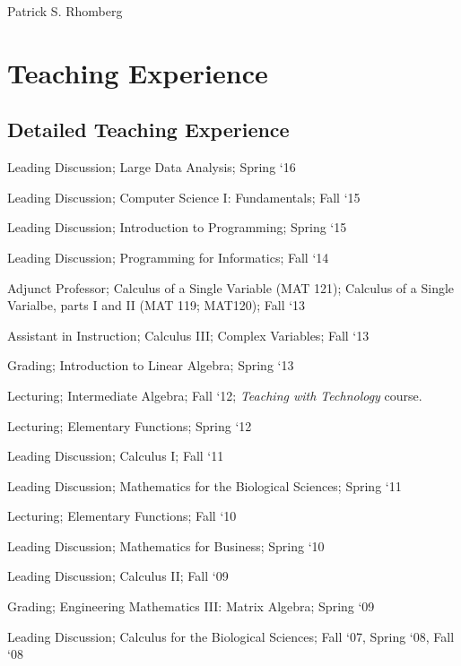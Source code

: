 \documentclass[10pt,letterpaper]{article}
\def\name{Patrick S. Rhomberg}
\renewenvironment{itemize}{
  \begin{list}{}{
    \setlength{\leftmargin}{1.5em}
    \setlength{\itemsep}{0.25em}
    \setlength{\parskip}{0pt}
    \setlength{\parsep}{0.25em}
  }
}{
  \end{list}
}
\begin{document}
{\huge \name}


\bigskip



\section*{Teaching Experience}


\subsection*{Detailed Teaching Experience}
\begin{itemize}
\item
  Leading Discussion;
  Large Data Analysis;
  Spring `16
\item
  Leading Discussion;
  Computer Science I: Fundamentals;
  Fall `15
\item
  Leading Discussion;
  Introduction to Programming;
  Spring `15
\item
  Leading Discussion;
  Programming for Informatics;
  Fall `14
\item
  Adjunct Professor;
  Calculus of a Single Variable (MAT 121);
  Calculus of a Single Varialbe, parts I and II (MAT 119; MAT120);
  Fall `13
\item
  Assistant in Instruction;
  Calculus III;
  Complex Variables;
  Fall `13
\item
  Grading;
  Introduction to Linear Algebra;
  Spring `13
\item
  Lecturing;
  Intermediate Algebra;
  Fall `12;
  {\em Teaching with Technology} course.
\item
  Lecturing;
  Elementary Functions;
  Spring `12
\item 
  Leading Discussion;
  Calculus I;
  Fall `11
\item
  Leading Discussion;
  Mathematics for the Biological Sciences;
  Spring `11
\item
  Lecturing;
  Elementary Functions;
  Fall `10
\item 
  Leading Discussion;
  Mathematics for Business;
  Spring `10
\item
  Leading Discussion;
  Calculus II;
  Fall `09
\item 
  Grading;
  Engineering Mathematics III: Matrix Algebra;
  Spring `09
\item
  Leading Discussion;
  Calculus for the Biological Sciences;
  Fall `07, Spring `08, Fall `08
\end{itemize}
\end{document}
